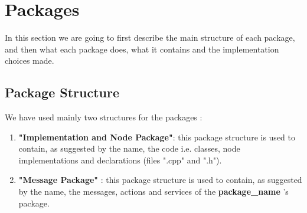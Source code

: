\section{Packages}
In this section we are going to first describe the main structure of each package, and then what each package does, what it contains and the implementation choices made.
\subsection{Package Structure}
We have used mainly two structures for the packages :
\begin{enumerate}    
    \item \textbf{"Implementation and Node Package"}: this package structure is used to contain, as suggested by the name, the code i.e. classes, node implementations and declarations (files ".cpp" and ".h").
        \newline
        \begin{minipage}{2cm}
        \end{minipage}        
    \item \textbf{"Message Package"} : this package structure is used to contain, as suggested by the name, the messages, actions and services of the \textbf{package\_name} 's package.
        \newline
        \begin{minipage}{2cm}
        \end{minipage}     
\end{enumerate}
